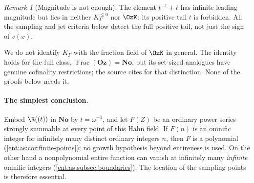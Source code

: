 \documentclass[11pt]{article}
\theoremstyle{plain}
\theoremstyle{plain}
\theoremstyle{plain}
\theoremstyle{definition}
\theoremstyle{definition}
\theoremstyle{definition}
\theoremstyle{definition}
\theoremstyle{remark}
\newtheorem{remark}[remark]{Remark}
\newcommand{\No}{\mathbf{No}}
\newcommand{\K}{K_\Gamma}\newcommand{\KD}{K_\Delta}
\newcommand{\Oz}{\mathbf{Oz}}\newcommand{\Ed}{\mathcal E_{\Gamma,d}}
\newcommand{\Kle}{K_\Gamma^{\le0}}\DeclareMathOperator{\Jac}{Jac}
\begin{document}
\begin{remark}[Magnitude is not enough]\label{ent:as:rem:magnitude}
The element $t^{-1}+t$ has infinite leading magnitude but lies in neither
$\Kle$ nor $\OzK$: its positive tail $t$ is forbidden. All the sampling and jet
criteria below detect the full positive tail, not just the sign of $v(x)$.
\end{remark}

We do not identify $\K$ with the fraction field of $\OzK$ in general. The
identity holds for the full class, $\operatorname{Frac}(\Oz)=\No$, but its
set-sized analogues have genuine cofinality restrictions; the source cites
\cite[Proposition~2.4.5]{LInnocenteMantova} for that distinction. None of the
proofs below needs it.

\paragraph{The simplest conclusion.} Embed $\R((t))$ in $\No$ by
$t=\omega^{-1}$, and let $F(Z)$ be an ordinary power series strongly summable
at every point of this Hahn field. If $F(n)$ is an omnific integer for
infinitely many distinct ordinary integers $n$, then $F$ is a polynomial
(\cref{ent:as:cor:finite-points}); no growth hypothesis beyond entireness is
used. On the other hand a nonpolynomial entire function can vanish at
infinitely many \emph{infinite} omnific integers
(\cref{ent:as:subsec:boundaries}). The location of the sampling points is
therefore essential.
\end{document}
